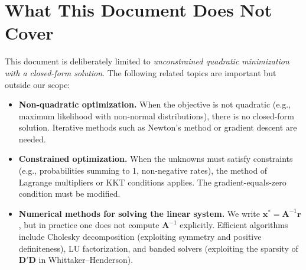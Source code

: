 \documentclass[11pt,a4paper]{article}
\begin{document}
\section{What This Document Does Not Cover}

This document is deliberately limited to \emph{unconstrained quadratic minimization with a closed-form solution}. The following related topics are important but outside our scope:

\begin{itemize}[nosep]
\item \textbf{Non-quadratic optimization.} When the objective is not quadratic (e.g., maximum likelihood with non-normal distributions), there is no closed-form solution. Iterative methods such as Newton's method or gradient descent are needed.

\item \textbf{Constrained optimization.} When the unknowns must satisfy constraints (e.g., probabilities summing to 1, non-negative rates), the method of Lagrange multipliers or KKT conditions applies. The gradient-equals-zero condition must be modified.

\item \textbf{Numerical methods for solving the linear system.} We write $\bm{x}^* = \bm{A}^{-1}\bm{r}$, but in practice one does not compute $\bm{A}^{-1}$ explicitly. Efficient algorithms include Cholesky decomposition (exploiting symmetry and positive definiteness), LU factorization, and banded solvers (exploiting the sparsity of $\bm{D}'\bm{D}$ in Whittaker--Henderson).
\end{itemize}
\end{document}
